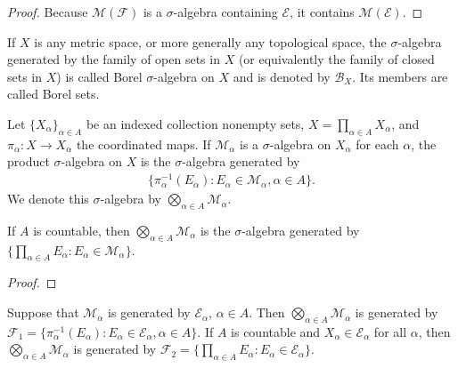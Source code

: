 \begin{proof}
    Because $\mathcal{M}(\mathcal{F})$ is a $\sigma$-algebra containing $\mathcal{E}$, it contains $\mathcal{M}(\mathcal{E})$.
\end{proof}

\begin{definition}
    If $X$ is any metric space, or more generally any topological space, the $\sigma$-algebra generated by the family of open sets in $X$ (or equivalently the family of closed sets in $X$) is called Borel $\sigma$-algebra on $X$ and is denoted by $\mathcal{B}_{X}$.
    Its members are called Borel sets.
\end{definition}

\begin{definition}
    Let $\{ X_{\alpha} \}_{\alpha \in A}$ be an indexed collection nonempty sets, $X = \prod_{\alpha \in A} X_{\alpha}$, and $\pi_{\alpha}: X \to X_{\alpha}$ the coordinated maps.
    If $\mathcal{M}_{\alpha}$ is a $\sigma$-algebra on $X_{\alpha}$ for each $\alpha$, the product $\sigma$-algebra on $X$ is the $\sigma$-algebra generated by
    \begin{align}
        \{ \pi_{\alpha}^{-1} (E_\alpha) : E_{\alpha} \in \mathcal{M}_{\alpha}, \alpha \in A \}.
    \end{align}
    We denote this $\sigma$-algebra by $\bigotimes_{\alpha \in A} \mathcal{M}_{\alpha}$.
\end{definition}

\begin{proposition}
    If $A$ is countable, then $\bigotimes_{\alpha \in A} \mathcal{M}_{\alpha}$ is the $\sigma$-algebra generated by $\{ \prod_{\alpha \in A} E_{\alpha} : E_{\alpha} \in \mathcal{M}_{\alpha} \}$.
\end{proposition}

\begin{proof}

\end{proof}

\begin{proposition}
    Suppose that $\mathcal{M}_{\alpha}$ is generated by $\mathcal{E}_{\alpha}$, $\alpha \in A$.
    Then $\bigotimes_{\alpha \in A} \mathcal{M}_{\alpha}$ is generated by $\mathcal{F}_1 = \{ \pi_{\alpha}^{-1} (E_\alpha) : E_{\alpha} \in \mathcal{E}_{\alpha}, \alpha \in A \}$.
    If $A$ is countable and $X_\alpha \in \mathcal{E}_{\alpha}$ for all $\alpha$, then $\bigotimes_{\alpha \in A} \mathcal{M}_{\alpha}$ is generated by $\mathcal{F}_2 = \{ \prod_{\alpha \in A} E_{\alpha} : E_{\alpha} \in \mathcal{E}_{\alpha}  \}$.
\end{proposition}

